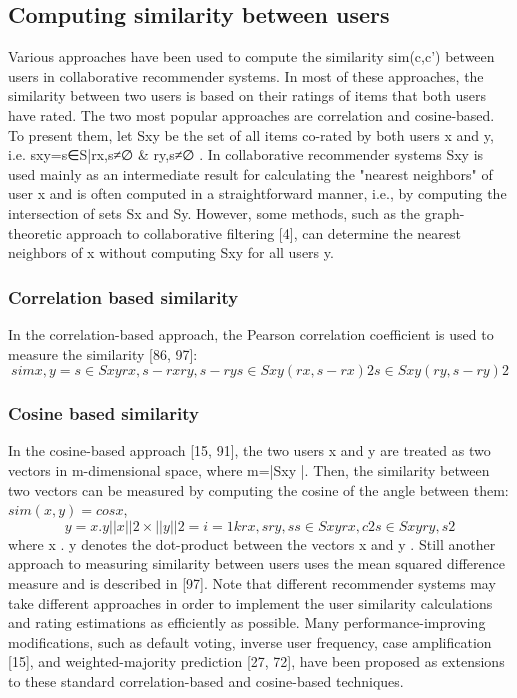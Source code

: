 \subsection{Computing similarity between users}
Various approaches have been used to compute the similarity sim(c,c') between users in collaborative recommender systems. In most of these approaches, the similarity between two users is based on their ratings of items that both users have rated. The two most popular approaches are correlation and cosine-based. To present them, let Sxy be the set of all items co-rated by both users x and y, i.e. sxy={s∈S|rx,s≠∅ & ry,s≠∅ }. In collaborative recommender systems Sxy is used mainly as an intermediate result for calculating the "nearest neighbors" of user x and is often computed in a straightforward manner, i.e., by computing the intersection of sets Sx and Sy. However, some methods, such as the graph-theoretic approach to collaborative filtering [4], can determine the nearest neighbors of x without computing Sxy for all users y.

\subsubsection{Correlation based similarity}
In the correlation-based approach, the Pearson correlation coefficient is used to measure the similarity [86, 97]:
\begin{equation}\label{eq:12}
simx,y=s\in Sxyrx,s-rxry,s-rys\in Sxy(rx,s-rx)2s\in Sxy(ry,s-ry)2
\end{equation}
\subsubsection{Cosine based similarity}
In the cosine-based approach [15, 91], the two users x and y are treated as two vectors in m-dimensional space, where m=|Sxy |. Then, the similarity between two vectors can be measured by computing the cosine of the angle between them:
$sim(x,y)=cosx $, \begin{equation}\label{eq:13}
y =x . y ||x||2 ×||y||2 =i=1krx,sry,ss\in Sxyrx,c2s\in Sxyry,s2 
\end{equation}
where x . y  denotes the dot-product between the vectors x and y . Still another approach  to measuring similarity between users uses the mean squared difference measure and is described in [97]. Note that different recommender systems may take different approaches in order to implement the user similarity calculations and rating estimations as efficiently as possible.
Many performance-improving modifications, such as default voting, inverse user frequency, case amplification [15], and weighted-majority prediction [27, 72], have been proposed as extensions to these standard correlation-based and cosine-based techniques.
